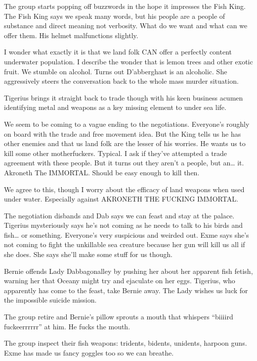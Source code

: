 The group starts popping off buzzwords in the hope it impresses the Fish King. The Fish King says we speak many words, but his people are a people of substance and direct meaning not verbosity. What do we want and what can we offer them. His helmet malfunctions slightly.\medskip

I wonder what exactly it is that we land folk CAN offer a perfectly content underwater population. I describe the wonder that is lemon trees and other exotic fruit. We stumble on alcohol. Turns out D’abberghast is an alcoholic. She aggressively steers the conversation back to the whole mass murder situation.\medskip

Tigerius brings it straight back to trade though with his keen business acumen identifying metal and weapons as a key missing element to under sea life.\medskip

We seem to be coming to a vague ending to the negotiations. Everyone’s roughly on board with the trade and free movement idea. But the King tells us he has other enemies and that us land folk are the lesser of his worries. He wants us to kill some other motherfuckers. Typical. I ask if they’ve attempted a trade agreement with these people. But it turns out they aren’t a people, but an… it. Akroneth The IMMORTAL. Should be easy enough to kill then.\medskip

We agree to this, though I worry about the efficacy of land weapons when used under water. Especially against AKRONETH THE FUCKING IMMORTAL.\medskip

The negotiation disbands and Dab says we can feast and stay at the palace. Tigerius mysteriously says he’s not coming as he needs to talk to his birds and fish… or something. Everyone’s very suspicious and weirded out. Exme says she’s not coming to fight the unkillable sea creature because her gun will kill us all if she does. She says she’ll make some stuff for us though.\medskip

Bernie offends Lady Dabbagonalley by pushing her about her apparent fish fetish, warning her that Oceany might try and ejaculate on her eggs. Tigerius, who apparently has come to the feast, take Bernie away. The Lady wishes us luck for the impossible suicide mission.\medskip

The group retire and Bernie’s pillow sprouts a mouth that whispers “biiiird fuckeerrrrrr” at him. He fucks the mouth.\medskip

The group inspect their fish weapons: tridents, bidents, unidents, harpoon guns. Exme has made us fancy goggles too so we can breathe.\medskip

